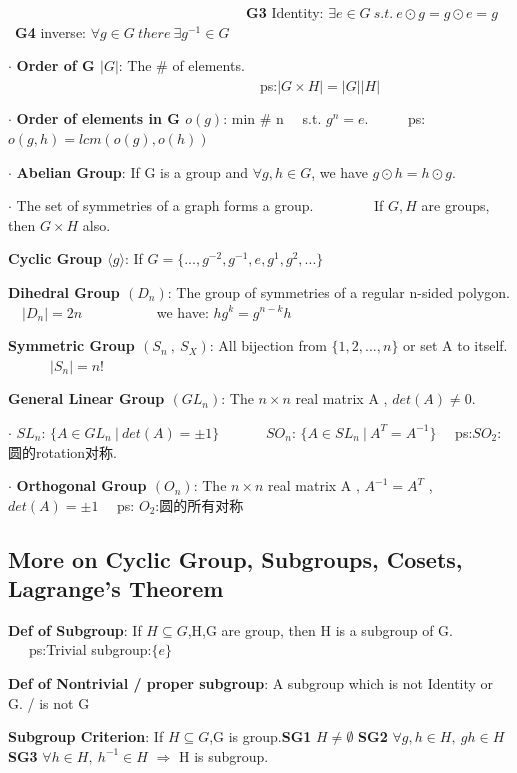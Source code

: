 \documentclass[11pt]{article}
\begin{document}
\ \ \ \ \ \ \ \ \ \ \ \ \ \ \ \ \ \ \ \ \ \ \ \ \ \ \ \ \ \ \ \ \ \ \textbf{G3} Identity: $\exists e\in G \ s.t. \ e\odot g=g\odot e=g$ \ \textbf{G4} inverse: $\forall g\in G \ there \ \exists g^{-1}\in G$

$\cdot$ \textbf{Order of G $|G|$}: The \# of elements.  \ \ \ \ \ \ \ \ \ \ \ \ \ \ \ \ \ \ \ \ \ \ \ \ \ \ \ \ \ \ \ \ \ \ \ \ ps:$|G\times H|=|G||H|$

$\cdot$ \textbf{Order of elements in G $o(g)$}: min \# n \ \ s.t. $g^n=e.$ \ \ \ \ \ ps:$o(g,h)=lcm\left(o(g),o(h)\right)$

$\cdot$ \textbf{Abelian Group}: If G is a group and $\forall g,h\in G$, we have $g\odot h = h \odot g.$

$\cdot$ The set of symmetries of a graph forms a group.  \ \ \ \ \ \ \ \ If $G,H$ are groups, then $G\times H$ also.

\textbf{Cyclic Group $\langle g\rangle$}: If $G=\{ ...,g^{-2},g^{-1},e,g^1,g^2,...\}$

\textbf{Dihedral Group $(D_n)$}: The group of symmetries of a regular n-sided polygon. \ \ $|D_n|=2n$ \ \ \ \ \ \ \ \ \ \ we have: $hg^k=g^{n-k}h$

\textbf{Symmetric Group $(S_n \ , \ S_X)$}: All bijection from $\{1,2,...,n\}$ or set A to itself. \ \ \ \ \ \ $|S_n|=n!$

\textbf{General Linear Group $(GL_n)$}: The $n\times n$ real matrix A , $det(A)\ne 0$.

$\cdot$ $SL_n$: $\{A\in GL_n \ | \ det(A)=\pm 1\}$  \ \ \ \ \ \ $SO_n$: $\{A\in SL_n \ | \ A^T=A^{-1} \}$ \ \ ps:$SO_2$:圆的rotation对称.

$\cdot$ \textbf{Orthogonal Group $(O_n)$}: The $n\times n$ real matrix A , $A^{-1}=A^T$ , $det(A)=\pm 1$ \ \ ps: $O_2$:圆的所有对称

\subsection{More on Cyclic Group, Subgroups, Cosets, Lagrange's Theorem}

\textbf{Def of Subgroup}: If $H\subseteq G$,H,G are group, then H is a subgroup of G. \ \ \ ps:Trivial subgroup:$\{e\}$

\textbf{Def of Nontrivial / proper subgroup}: A subgroup which is not Identity or G. / is not G

\textbf{Subgroup Criterion}: If $H\subseteq G$,G is group.\textbf{SG1} $H\ne \emptyset$ \textbf{SG2} $\forall g,h\in H, \ gh\in H$ \textbf{SG3} $\forall h\in H, \ h^{-1}\in H$ $\Rightarrow$ H is subgroup.
\end{document}
